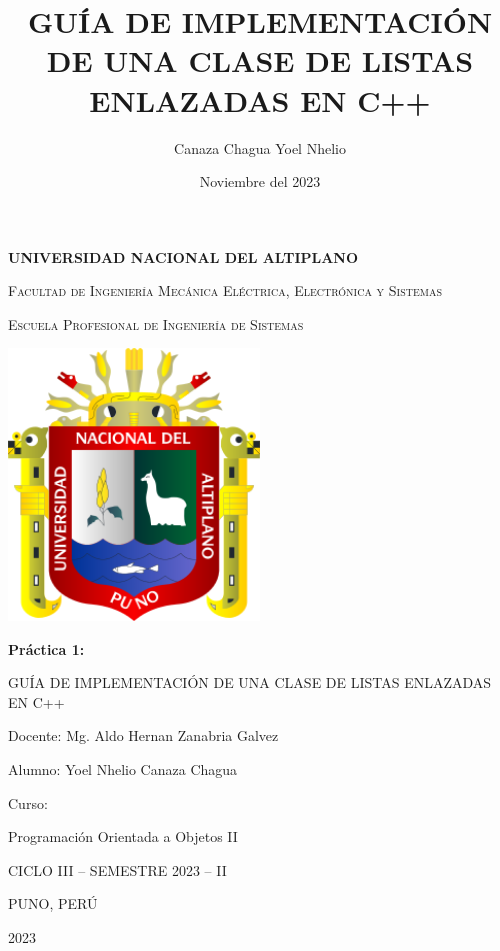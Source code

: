 \documentclass[11pt,a4paper]{article}
\begin{document}
\begin{titlepage}
\centering


{\bfseries\LARGE UNIVERSIDAD NACIONAL DEL ALTIPLANO\par}
{\scshape\LARGE Facultad de Ingeniería Mecánica Eléctrica, Electrónica y Sistemas\par}
{\scshape\LARGE Escuela Profesional de Ingeniería de Sistemas\par}
\vspace{1cm}
{\includegraphics[width=0.5\textwidth]{images/1-unap.png}\par}
\vspace{0.5cm}
{\bfseries\LARGE Práctica 1:

GUÍA DE IMPLEMENTACIÓN DE UNA CLASE DE LISTAS ENLAZADAS EN C++\par}
\vspace{1cm}
{\LARGE Docente: Mg. Aldo Hernan Zanabria Galvez \par}
{\LARGE Alumno: Yoel Nhelio Canaza Chagua \par}
\vspace{1cm}
{\LARGE Curso: \par}
{\LARGE Programación Orientada a Objetos II \par}
\vspace{1cm}
{\LARGE CICLO III – SEMESTRE 2023 – II \par}
{\LARGE PUNO, PERÚ \par}
{\LARGE 2023 \par}


\end{titlepage}


\author{Canaza Chagua Yoel Nhelio}
\title{GUÍA DE IMPLEMENTACIÓN DE UNA CLASE DE LISTAS ENLAZADAS EN C++}
\date{Noviembre del 2023}


\maketitle
\end{document}

